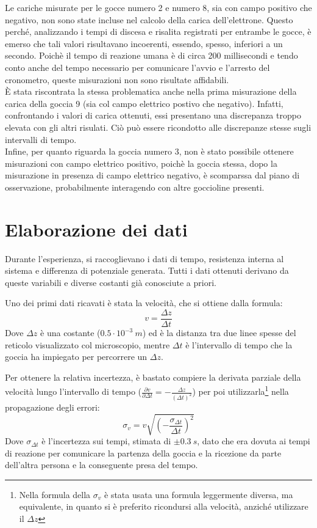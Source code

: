 \documentclass{article}
\begin{document}
Le cariche misurate per le gocce numero 2 e numero 8, sia con campo positivo che negativo, non sono state incluse nel calcolo della carica dell'elettrone. Questo perché, analizzando i tempi di discesa e risalita registrati per entrambe le gocce, è emerso che tali valori risultavano incoerenti, essendo, spesso, inferiori a un secondo. Poichè il tempo di reazione umana è di circa 200 millisecondi e tendo conto anche del tempo necessario per comunicare l'avvio e l'arresto del cronometro, queste misurazioni non sono risultate affidabili.\\

È stata riscontrata la stessa problematica anche nella prima misurazione della carica della goccia 9 (sia col campo elettrico postivo che negativo). Infatti, confrontando i valori di carica ottenuti, essi presentano una discrepanza troppo elevata con gli altri risulati. Ciò può essere ricondotto alle discrepanze stesse sugli intervalli di tempo.\\

Infine, per quanto riguarda la goccia numero 3, non è stato possibile ottenere misurazioni con campo elettrico positivo, poichè la goccia stessa, dopo la misurazione in presenza di campo elettrico negativo, è scomparssa dal piano di osservazione, probabilmente interagendo con altre goccioline presenti.

\section{Elaborazione dei dati}
Durante l'esperienza, si raccoglievano i dati di tempo, resistenza interna al sistema e differenza di potenziale generata. Tutti i dati ottenuti derivano da queste variabili e diverse costanti già conosciute a priori.

Uno dei primi dati ricavati è stata la velocità, che si ottiene dalla formula:
\begin{equation}
	v=\frac{\Delta z}{\Delta t}
	\label{velocita_limite}
\end{equation}
Dove $\Delta z$ è una costante ($0.5\cdot10^{-3}\ m$) ed è la distanza tra due linee spesse del reticolo visualizzato col microscopio, mentre $\Delta t$ è l'intervallo di tempo che la goccia ha impiegato per percorrere un $\Delta z$.

Per ottenere la relativa incertezza, è bastato compiere la derivata parziale della velocità lungo l'intervallo di tempo ($\frac{\partial v}{\partial \Delta t}=-\frac{\Delta z}{(\Delta t)^2}$) per poi utilizzarla\footnote{Nella formula della $\sigma_v$ è stata usata una formula leggermente diversa, ma equivalente, in quanto si è preferito ricondursi alla velocità, anziché utilizzare il $\Delta z$} nella propagazione degli errori:
\begin{equation}
	\sigma_v=v\sqrt{\left(-\frac{\sigma_{\Delta t}}{\Delta t}\right)^2}
	\label{sigma_v}
\end{equation}
Dove $\sigma_{\Delta t}$ è l'incertezza sui tempi, stimata di $\pm0.3\ s$, dato che era dovuta ai tempi di reazione per comunicare la partenza della goccia e la ricezione da parte dell'altra persona e la conseguente presa del tempo.\\
\end{document}
